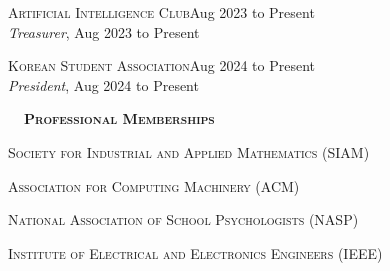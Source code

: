 \documentclass[hidelinks, 10.5pt]{article}
\def\contentwidth{0.9\linewidth}    %
\def\contentblockspacing{2.5mm}     %
\def\sectionspacing{8mm}            %
\def\sectiontocontentspacing{4mm}   %
\renewcommand{\section}[1]{
    {\fontsize{14}{14}\selectfont \textsc{\textbf{\ \ #1\ \ }}}\hrulefill
}
\begin{document}
{\vspace{\contentblockspacing}

\begin{minipage}[ct]{\contentwidth}
    \textsc{Artificial Intelligence Club}\hfill Aug 2023 to Present\\
    \emph{Treasurer}, Aug 2023 to Present
\end{minipage}

\vspace{\contentblockspacing}

\begin{minipage}[ct]{\contentwidth}
    \textsc{Korean Student Association}\hfill Aug 2024 to Present\\
    \emph{President}, Aug 2024 to Present
\end{minipage}

\vspace{\sectionspacing}


\section{Professional Memberships}

\vspace{\sectiontocontentspacing}

\begin{minipage}[ct]{\contentwidth}
    \textsc{Society for Industrial and Applied Mathematics} (SIAM)
\end{minipage}

\vspace{0.5mm}

\begin{minipage}[ct]{\contentwidth}
    \textsc{Association for Computing Machinery} (ACM)
\end{minipage}

\vspace{0.5mm}

\begin{minipage}[ct]{\contentwidth}
    \textsc{National Association of School Psychologists} (NASP)
\end{minipage}

\vspace{0.5mm}

\begin{minipage}[ct]{\contentwidth}
    \textsc{Institute of Electrical and Electronics Engineers} (IEEE)
\end{minipage}

}
\end{document}
